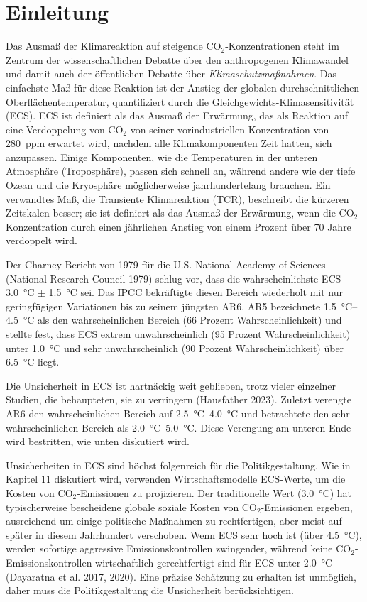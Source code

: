 \documentclass[12pt,paper=a4,DIV=12,parskip=never,chapterprefix=false,headings=standardclasses]{scrreprt}
\begin{document}
\section{Einleitung}
Das Ausmaß der Klimareaktion auf steigende CO$_2$-Konzentrationen steht im Zentrum der wissenschaftlichen Debatte über den anthropogenen Klimawandel und damit auch der öffentlichen Debatte über \emph{Klimaschutzmaßnahmen}. Das einfachste Maß für diese Reaktion ist der Anstieg der globalen durchschnittlichen Oberflächentemperatur, quantifiziert durch die Gleichgewichts-Klimasensitivität (ECS). ECS ist definiert als das Ausmaß der Erwärmung, das als Reaktion auf eine Verdoppelung von CO$_2$ von seiner vorindustriellen Konzentration von \SI{280}{ppm} erwartet wird, nachdem alle Klimakomponenten Zeit hatten, sich anzupassen. Einige Komponenten, wie die Temperaturen in der unteren Atmosphäre (Troposphäre), passen sich schnell an, während andere wie der tiefe Ozean und die Kryosphäre möglicherweise jahrhundertelang brauchen. Ein verwandtes Maß, die Transiente Klimareaktion (TCR), beschreibt die kürzeren Zeitskalen besser; sie ist definiert als das Ausmaß der Erwärmung, wenn die CO$_2$-Konzentration durch einen jährlichen Anstieg von einem Prozent über 70 Jahre verdoppelt wird.

Der Charney-Bericht von 1979 für die U.S. National Academy of Sciences (National Research Council 1979) schlug vor, dass die wahrscheinlichste ECS \SI{3.0}{\celsius} $\pm$ \SI{1.5}{\celsius} sei. Das IPCC bekräftigte diesen Bereich wiederholt mit nur geringfügigen Variationen bis zu seinem jüngsten AR6. AR5 bezeichnete \SIrange{1.5}{4.5}{\celsius} als den wahrscheinlichen Bereich (66 Prozent Wahrscheinlichkeit) und stellte fest, dass ECS extrem unwahrscheinlich (95 Prozent Wahrscheinlichkeit) unter \SI{1.0}{\celsius} und sehr unwahrscheinlich (90 Prozent Wahrscheinlichkeit) über \SI{6.5}{\celsius} liegt.

Die Unsicherheit in ECS ist hartnäckig weit geblieben, trotz vieler einzelner Studien, die behaupteten, sie zu verringern (Hausfather 2023). Zuletzt verengte AR6 den wahrscheinlichen Bereich auf \SIrange{2.5}{4.0}{\celsius} und betrachtete den sehr wahrscheinlichen Bereich als \SIrange{2.0}{5.0}{\celsius}. Diese Verengung am unteren Ende wird bestritten, wie unten diskutiert wird.

Unsicherheiten in ECS sind höchst folgenreich für die Politikgestaltung. Wie in Kapitel 11 diskutiert wird, verwenden Wirtschaftsmodelle ECS-Werte, um die Kosten von CO$_2$-Emissionen zu projizieren. Der traditionelle Wert (\SI{3.0}{\celsius}) hat typischerweise bescheidene globale soziale Kosten von CO$_2$-Emissionen ergeben, ausreichend um einige politische Maßnahmen zu rechtfertigen, aber meist auf später in diesem Jahrhundert verschoben. Wenn ECS sehr hoch ist (über \SI{4.5}{\celsius}), werden sofortige aggressive Emissionskontrollen zwingender, während keine CO$_2$-Emissionskontrollen wirtschaftlich gerechtfertigt sind für ECS unter \SI{2.0}{\celsius} (Dayaratna et al. 2017, 2020). Eine präzise Schätzung zu erhalten ist unmöglich, daher muss die Politikgestaltung die Unsicherheit berücksichtigen.
\end{document}

